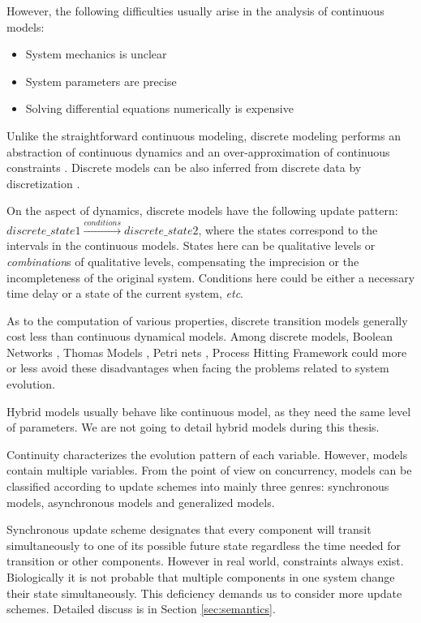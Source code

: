 However, the following difficulties usually arise in the analysis of continuous models:

\begin{itemize}
    \item System mechanics is unclear
    \item System parameters are precise 
    \item Solving differential equations numerically is expensive 
\end{itemize}

Unlike the straightforward continuous modeling, discrete modeling performs an abstraction of continuous dynamics and an over-approximation of continuous constraints \cite{bernot2009}.
Discrete models can be also inferred from discrete data by discretization \cite{dimitrova2006polynomial}.

On the aspect of dynamics, discrete models have the following update pattern: $discrete\_state1\xrightarrow{conditions}discrete\_state2$, where the states correspond to the intervals in the continuous models. 
States here can be qualitative levels or \textit{combination}s of qualitative levels, compensating the imprecision or the incompleteness of the original system.
Conditions here could be either a necessary time delay or a state of the current system, \textit{etc}.

As to the computation of various properties, discrete transition models generally cost less than continuous dynamical models.
Among discrete models, Boolean Networks \cite{kauffman1969}, Thomas Models \cite{thomas1978}, Petri nets \cite{pinney2003petri}, Process Hitting Framework \cite{pauleve2011} could more or less avoid these disadvantages when facing the problems related to system evolution.

Hybrid models \cite{wang2015sreach,lincoln2004symbolic,singhania2011hybrid} usually behave like continuous model, as they need the same level of parameters.
We are not going to detail hybrid models during this thesis.

Continuity characterizes the evolution pattern of each variable.
However, models contain multiple variables.
From the point of view on concurrency, models can be classified according to update schemes into mainly three genres: synchronous models, asynchronous models and generalized models.

Synchronous update scheme designates that every component will transit simultaneously to one of its possible future state regardless the time needed for transition or other components.
However in real world, constraints always exist.
Biologically it is not probable that multiple components in one system change their state simultaneously.
This deficiency demands us to consider more update schemes.
Detailed discuss is in Section \ref{sec:semantics}.


